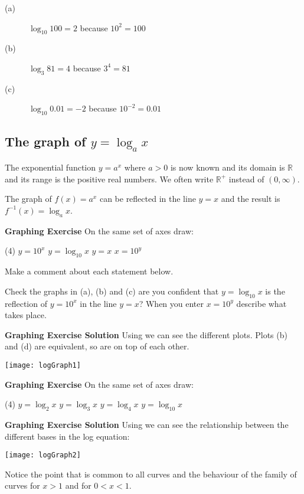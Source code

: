 \example
\begin{description}
	\item [(a)] $\log _{10} 100 =2$ because $10^{2} =100$ 
	
	\item [(b)] $\log _{3} 81 =4$ because $3^{4} =81$ 
	
	\item [(c)] $\log _{10} 0.01 = -2$ because $10^{ -2} =0.01$ \end{description}

\subsection*{The graph of $y =\log _{a} x$}
The exponential function $y =a^{x}$ where $a >0$ is now known and its domain is $\mathbb{R}$ and its range is the positive real numbers. We often
write $\mathbb{R}^{ +}$ instead of $\left (0 ,\infty \right )$. 

The graph of $f (x) =a^{x}$ can be reflected in the line $y =x$ and the result is $f^{ -1} (x) =\log _{a} x$. 

\textbf{Graphing Exercise} On the same set of axes draw:
\begin{tasks}(4)
	\task $y =10^{x}$ 
	\task $y =\log _{10} x$ 
	\task $y =x$ 
	\task $x =10^{y}$ 
\end{tasks}

Make a comment about each statement below. 
\begin{tasks}
	\task[1.] Check the graphs in (a), (b) and (c) are you confident that $y =\log _{10} x$ is the reflection of $y =10^{x}$ in the line $y =x$?
	\task[2.] When you enter $x =10^{y}$ describe what takes place.
	\end{tasks}

\textbf{Graphing Exercise Solution} Using \desmos we can see the different plots. Plots (b) and (d) are equivalent, so are on top of each other.\\
\begin{center}
\texttt{[image: logGraph1]}\\
\end{center}

\textbf{Graphing Exercise} On the same set of axes draw:
\begin{tasks}(4)
	\task $y =\log _{2} x$ 
	\task $y =\log _{3} x$ 
	\task $y =\log _{4} x$ 
	\task $y =\log _{10} x$ \end{tasks}
\textbf{Graphing Exercise Solution} Using \desmos we can see the relationship between the different bases in the log equation:\\
\begin{center}\texttt{[image: logGraph2]}\end{center}
Notice the point that is common to all curves and the behaviour of the family of curves for $x >1$ and for $0 <x <1$. 

